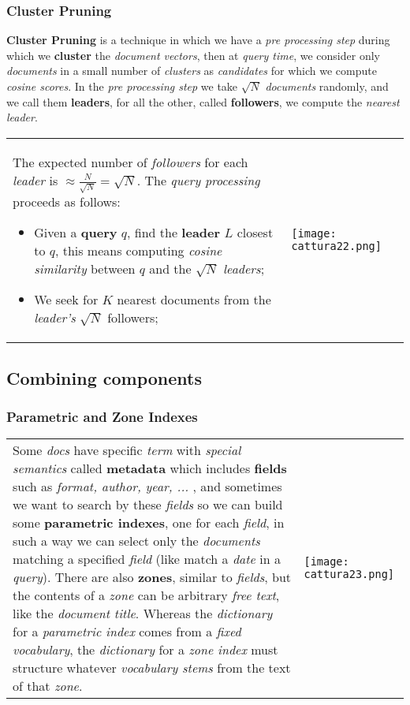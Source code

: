 \documentclass{article}
\begin{document}
\subsubsection{Cluster Pruning}
\textbf{Cluster Pruning} is a technique in which we have a\emph{ pre processing step} during which we \textbf{cluster} the \emph{document vectors}, then at \emph{query time}, we consider only \emph{documents} in a small number of \emph{clusters} as \emph{candidates} for which we compute \emph{cosine scores}. In the \emph{pre processing step} we take $\sqrt{N}$ \emph{documents} randomly, and we call them \textbf{leaders}, for all the other, called \textbf{followers}, we compute the \emph{nearest leader}. 
\clearpage
\begin{tabular}{L{10cm} C{5.5cm}}
       The expected number of \emph{followers} for each \emph{leader} is $\approx \frac{N}{\sqrt{N}} = \sqrt{N}$. The \emph{query processing }proceeds as follows:
\begin{itemize}
\item Given a \textbf{query} $q$, find the \textbf{leader} $L$ closest to $q$, this means computing \emph{cosine similarity} between $q$ and the $\sqrt{N}$ \emph{leaders};
\item We seek for $K$ nearest documents from the \emph{leader's} $\sqrt{N}$ followers;
\end{itemize} &
\texttt{[image: cattura22.png]} 
\end{tabular}

\subsection{Combining components}
\subsubsection{Parametric and Zone Indexes}
\begin{tabular}{L{8cm} C{5.5cm}}
Some \emph{docs} have specific \emph{term} with \emph{special semantics} called \textbf{metadata} which includes \textbf{fields} such as \emph{format, author, year, ... }, and sometimes we want to search by these \emph{fields} so we can build some \textbf{parametric indexes}, one for each \emph{field}, in such a way we can select only the \emph{documents} matching a specified \emph{field} (like match a \emph{date} in a \emph{query}). There are also \textbf{zones}, similar to \emph{fields}, but the contents of a \emph{zone} can be arbitrary \emph{free text}, like the \emph{document title}. Whereas the \emph{dictionary} for a \emph{parametric index} comes from a \emph{fixed vocabulary}, the \emph{dictionary} for a \emph{zone index} must structure whatever \emph{vocabulary stems} from the text of that \emph{zone}.
& \texttt{[image: cattura23.png]} 
\end{tabular}
\end{document}
